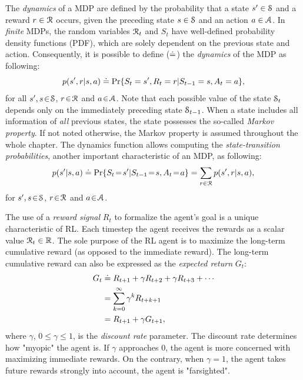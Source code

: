 \documentclass[a4paper, twoside, 12pt]{article}
\begin{document}
The \emph{dynamics} of a MDP are defined by the probability that a state \(s'\in \S\)
and a reward \(r\in\R\) occurs, given the preceding state \(s\in\S\) and an action
\(a\in\A\). In \emph{finite} MDPs, the random variables \(\R_t\) and \(S_t\) have
well-defined probability density functions (PDF), which are solely dependent on
the previous state and action. Consequently, it is possible to define (\(\defeq\))
the \emph{dynamics} of the MDP as following:
\begin{equation} \label{eq-dynamics}
    p(s',r|s,a) \defeq \Pr{S_t=s',R_t=r|S_{t-1}=s,A_t=a},
\end{equation}
for all \(s',s\!\in\!\S\), \(r\!\in\!\R\) and \(a\!\in\!\A\). Note that each possible
value of the state \(\S_t\) depends only on the immediately preceding state
\(\S_{t-1}\). When a state includes all information of \emph{all} previous states, the
state possesses the so-called \emph{Markov property}. If not noted otherwise, the
Markov property is assumed throughout the whole chapter. The dynamics function
allows computing the \emph{state-transition probabilities}, another important
characteristic of an MDP, as following:
\begin{equation} \label{eq-state-transition}
    p(s'|s,a) \defeq \Pr{S_t\!=\!s'|S_{t-1}\!=\!s,A_t\!=\!a} = \sum_{r\in\R}{p(s', r|s, a)},
\end{equation}
for \(s',s\!\in\!\S\), \(r\!\in\!\R\) and \(a\!\in\!\A\).

The use of a \emph{reward signal} \(R_t\) to formalize the agent's goal is a unique
characteristic of RL. Each timestep the agent receives the rewards as a scalar
value \(\R_t\in\Re\). The sole purpose of the RL agent is to maximize the
long-term cumulative reward (as opposed to the immediate reward). The long-term
cumulative reward can also be expressed as the \emph{expected return} \(G_t\):
\begin{equation} \label{eq-expected-return}
\begin{split}
    G_t &\defeq R_{t+1} + \gamma R_{t+2} + \gamma R_{t+3} + \cdots \\
    &= \sum_{k=0}^{\infty}{\gamma^k R_{t+k+1}} \\
    &= R_{t+1} + \gamma G_{t+1},
\end{split}
\end{equation}
where \(\gamma\), \(0\leq\gamma\leq 1\), is the \emph{discount rate} parameter. The
discount rate determines how "myopic" the agent is. If \(\gamma\) approaches 0,
the agent is more concerned with maximizing immediate rewards. On the contrary,
when \(\gamma\!=\! 1\), the agent takes future rewards strongly into account, the
agent is "farsighted".
\end{document}
